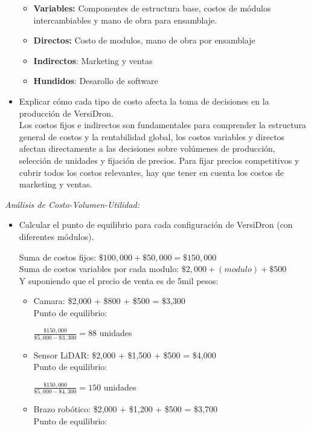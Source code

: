 \documentclass[letterpaper,12pt]{article}
\begin{document}
\begin{sloppypar}
\begin{itemize}
\begin{itemize}
        \item \textbf{Variables:} Componentes de estructura base, costos de módulos intercambiables y mano de obra para ensamblaje.
        \item \textbf{Directos:} Costo de modulos, mano de obra por ensamblaje
        \item \textbf{Indirectos}: Marketing y ventas
        \item \textbf{Hundidos}: Desarollo de software
    \end{itemize}
    \newpage
    \item Explicar cómo cada tipo de costo afecta la toma de decisiones en la producción de VersiDron.\\ Los costos fijos e indirectos son fundamentales para comprender la estructura general de costos y la rentabilidad global, los costos variables y directos afectan directamente a las decisiones sobre volúmenes de producción, selección de unidades y fijación de precios. Para fijar precios competitivos y cubrir todos los costos relevantes, hay que tener en cuenta los costos de marketing y ventas.
\end{itemize}
\textit{Análisis de Costo-Volumen-Utilidad:}
\begin{itemize}
    \item Calcular el punto de equilibrio para cada configuración de VersiDron (con
    diferentes módulos).
    \begin{center}
    Suma de costos fijos:
    $\$100,000 + \$50,000 = \$150,000$ \\ 
    Suma de costos variables por cada modulo: $\$2,000 + (modulo) + \$500$ \\ 
    Y suponiendo que el precio de venta es de 5mil pesos:
    \begin{itemize}
        \item Camara: \$2,000 + \$800 + \$500 = \$3,300 \\ Punto de equilibrio:
        
        $\displaystyle \frac{\$150,000}{\$5,000 - \$3,300} = 88$ unidades
        \item Sensor LiDAR:  \$2,000 + \$1,500 + \$500 = \$4,000 \\ Punto de equilibrio:
        
        $\displaystyle \frac{\$150,000}{\$5,000 - \$4,300} = 150$ unidades
        \item Brazo robótico:  \$2,000 + \$1,200 + \$500 = \$3,700 \\ Punto de equilibrio:
        

\end{itemize}
\end{center}
\end{itemize}
\end{sloppypar}
\end{document}
